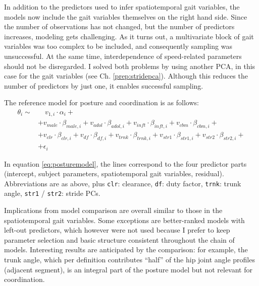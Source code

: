 In addition to the predictors used to infer spatiotemporal gait variables, the models now include the gait variables themselves on the right hand side.
Since the number of observations has not changed, but the number of predictors increases, modeling gets challenging.
As it turns out, a multivariate block of gait variables was too complex to be included, and consequently sampling was unsuccessful.
At the same time, interdependence of speed-related parameters should not be disregarded.
I solved both problems by using another PCA, in this case for the gait variables (see Ch. \ref{prep:stridepca}).
Although this reduces the number of predictors by just one, it enables successful sampling.

The reference model for posture and coordination is as follows:
\begin{equation}
\begin{split}
 \theta_{i}  \sim &\quad v_{1,i}\cdot\alpha_{i} +
\\ & + v_{male}\cdot\beta_{male,i} + v_{adol}\cdot\beta_{adol,i} + v_{inft}\cdot\beta_{inft,i} + v_{cbm}\cdot\beta_{cbm,i} +
\\ & + v_{clr}\cdot\beta_{clr,i} + v_{df}\cdot\beta_{df,i} + v_{trnk}\cdot\beta_{trnk,i} + v_{str1}\cdot\beta_{str1,i} + v_{str2}\cdot\beta_{str2,i} +
\\ & + \epsilon_{i}
\end{split}
 \label{eq:posturemodel} \end{equation}

In equation \eqref{eq:posturemodel}, the lines correspond to the four predictor parts (intercept, subject parameters, spatiotemporal gait variables, residual).
Abbreviations are as above, plus \texttt{clr}: clearance, \texttt{df}: duty factor, \texttt{trnk}: trunk angle, \texttt{str1} / \texttt{str2}: stride PCs.



Implications from model comparison are overall similar to those in the spatiotemporal gait variables.
Some exceptions are better-ranked models with left-out predictors, which however were not used because I prefer to keep parameter selection and basic structure consistent throughout the chain of models.
Interesting results are anticipated by the comparison: for example, the trunk angle, which per definition contributes ``half'' of the hip joint angle profiles (adjacent segment), is an integral part of the posture model but not relevant for coordination.

